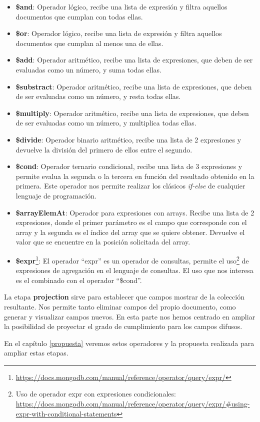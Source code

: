 \begin{itemize}
    \item \textbf{\$and}: Operador lógico, recibe una lista de expresión y filtra aquellos documentos que cumplan con todas ellas.
    \item \textbf{\$or}: Operador lógico, recibe una lista de expresión y filtra aquellos documentos que cumplan al menos una de ellas.
    \item \textbf{\$add}: Operador aritmético, recibe una lista de expresiones, que deben de ser evaluadas como un número, y suma todas ellas.
    \item \textbf{\$substract}: Operador aritmético, recibe una lista de expresiones, que deben de ser evaluadas como un número, y resta todas ellas.
    \item \textbf{\$multiply}: Operador aritmético, recibe una lista de expresiones, que deben de ser evaluadas como un número, y multiplica todas ellas.
    \item \textbf{\$divide}: Operador binario aritmético, recibe una lista de 2 expresiones y devuelve la división del primero de ellos entre el segundo.
    \item \textbf{\$cond}: Operador ternario condicional, recibe una lista de 3 expresiones y permite evalua la segunda o la tercera en función del resultado obtenido en la primera. Este operador nos permite realizar los clásicos \textit{if-else} de cualquier lenguaje de programación.
    \item \textbf{\$arrayElemAt}: Operador para expresiones con arrays. Recibe una lista de 2 expresiones, donde el primer parámetro es el campo que corresponde con el array y la segunda es el índice del array que se quiere obtener. Devuelve el valor que se encuentre en la posición solicitada del array.
    \item \textbf{\$expr}\footnote{\url{https://docs.mongodb.com/manual/reference/operator/query/expr/}}: El operador ``expr'' es un operador de consultas, permite el uso\footnote{Uso de operador expr con expresiones condicionales: \url{https://docs.mongodb.com/manual/reference/operator/query/expr/\#using-expr-with-conditional-statements}} de expresiones de agregación en el lenguaje de consultas. El uso que nos interesa es el combinado con el operador ``\$cond''.
\end{itemize}

La etapa \textbf{projection} sirve para establecer que campos mostrar de la colección resultante. Nos permite tanto eliminar campos del propio documento, como generar y visualizar campos nuevos. En esta parte nos hemos centrado en ampliar la posibilidad de proyectar el grado de cumplimiento para los campos difusos.

En el capítulo \ref{propuesta} veremos estos operadores y la propuesta realizada para ampliar estas etapas.
